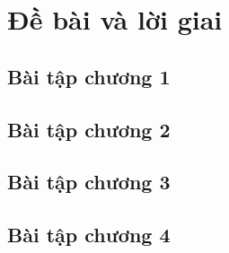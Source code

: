 \documentclass[11pt,openany]{book}
\theoremstyle{definition}
\theoremstyle{plain}
\begin{document}
\indapanrutgon
\begin{multicols}{3}
\begin{enumerate}[\causo]
\foreachproblem[btsuatu]{\item\thisproblem}
\end{enumerate}
\end{multicols}


\chapter{Đề bài và lời giai}
\minitoc %
\thispagestyle{empty}


\indebailoigiai
\section{Bài tập chương 1}
\setcounter{chapter}{1}
\begin{enumerate}[]
\foreachproblem[bttuluan]{\item\causo\thisproblem}
\end{enumerate}

\indebailoigiai
\section{Bài tập chương 2}
\setcounter{chapter}{2}
\begin{enumerate}[]
\foreachproblem[bttracnghiem]{\item\causo\thisproblem}
\end{enumerate}

\indebailoigiai
\section{Bài tập chương 3}
\setcounter{chapter}{3}
\begin{enumerate}[]
\foreachproblem[btdiencho]{\item\causo\thisproblem}
\end{enumerate}

\indebailoigiai
\section{Bài tập chương 4}
\setcounter{chapter}{4}
\begin{enumerate}[]
\foreachproblem[btdungsai]{\item\causo\thisproblem}
\end{enumerate}
\end{document}
